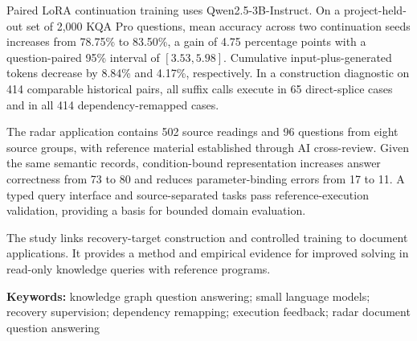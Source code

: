 Paired LoRA continuation training uses Qwen2.5-3B-Instruct. On a project-held-out set of 2,000 KQA Pro questions, mean accuracy across two continuation seeds increases from 78.75\% to 83.50\%, a gain of 4.75 percentage points with a question-paired 95\% interval of $[3.53,5.98]$. Cumulative input-plus-generated tokens decrease by 8.84\% and 4.17\%, respectively. In a construction diagnostic on 414 comparable historical pairs, all suffix calls execute in 65 direct-splice cases and in all 414 dependency-remapped cases.

The radar application contains 502 source readings and 96 questions from eight source groups, with reference material established through AI cross-review. Given the same semantic records, condition-bound representation increases answer correctness from 73 to 80 and reduces parameter-binding errors from 17 to 11. A typed query interface and source-separated tasks pass reference-execution validation, providing a basis for bounded domain evaluation.

The study links recovery-target construction and controlled training to document applications. It provides a method and empirical evidence for improved solving in read-only knowledge queries with reference programs.

\noindent\textbf{Keywords:} knowledge graph question answering; small language models; recovery supervision; dependency remapping; execution feedback; radar document question answering
